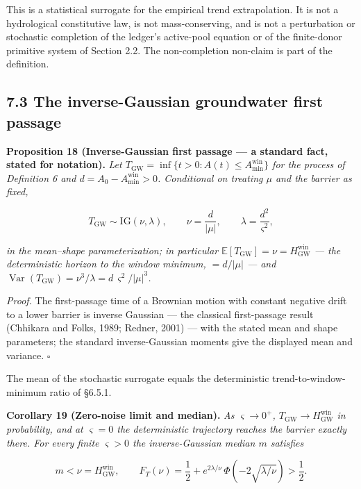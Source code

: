 \documentclass[11pt]{article}
\begin{document}
This is a statistical surrogate for the empirical trend extrapolation. It is not a hydrological constitutive law, is not mass-conserving, and is not a perturbation or stochastic completion of the ledger's active-pool equation or of the finite-donor primitive system of Section 2.2. The non-completion non-claim is part of the definition.

\subsection*{7.3 The inverse-Gaussian groundwater first passage}\label{73-the-inverse-gaussian-groundwater-first-passage}

\textbf{Proposition 18 (Inverse-Gaussian first passage --- a standard fact, stated for notation).} \emph{Let \(T_{\mathrm{GW}} =\allowbreak{} \inf\{ t > 0 : A(t) \le A_{\min}^{\mathrm{win}} \}\) for the process of Definition 6 and \(d =\allowbreak{} A_0 - A_{\min}^{\mathrm{win}} > 0\). Conditional on treating \(\mu\) and the barrier as fixed,} 

$$T_{\mathrm{GW}} \sim \mathrm{IG}(\nu, \lambda), \qquad \nu = \frac{d}{|\mu|}, \qquad \lambda = \frac{d^2}{\varsigma^2},$$

 \emph{in the mean--shape parameterization; in particular \(\mathbb{E}[T_{\mathrm{GW}}] =\allowbreak{} \nu =\allowbreak{} H^{\mathrm{win}}_{\mathrm{GW}}\) --- the deterministic horizon to the window minimum, \(= d/|\mu|\) --- and \(\operatorname{Var}(T_{\mathrm{GW}}) =\allowbreak{} \nu^3/\lambda =\allowbreak{} d\,\allowbreak{}\varsigma^2/|\mu|^3\).}

\emph{Proof.} The first-passage time of a Brownian motion with constant negative drift to a lower barrier is inverse Gaussian --- the classical first-passage result (Chhikara and Folks, 1989; Redner, 2001) --- with the stated mean and shape parameters; the standard inverse-Gaussian moments give the displayed mean and variance. \(\square\)

The mean of the stochastic surrogate equals the deterministic trend-to-window-minimum ratio of \S6.5.1.

\textbf{Corollary 19 (Zero-noise limit and median).} \emph{As \(\varsigma \to 0^+\), \(T_{\mathrm{GW}} \to H^{\mathrm{win}}_{\mathrm{GW}}\) in probability, and at \(\varsigma = 0\) the deterministic trajectory reaches the barrier exactly there. For every finite \(\varsigma > 0\) the inverse-Gaussian median \(m\) satisfies} 

$$m < \nu = H^{\mathrm{win}}_{\mathrm{GW}}, \qquad F_T(\nu) = \frac{1}{2} + e^{2\lambda/\nu}\,\Phi\!\left( -2\sqrt{\lambda/\nu} \right) > \frac{1}{2}.$$
\end{document}
